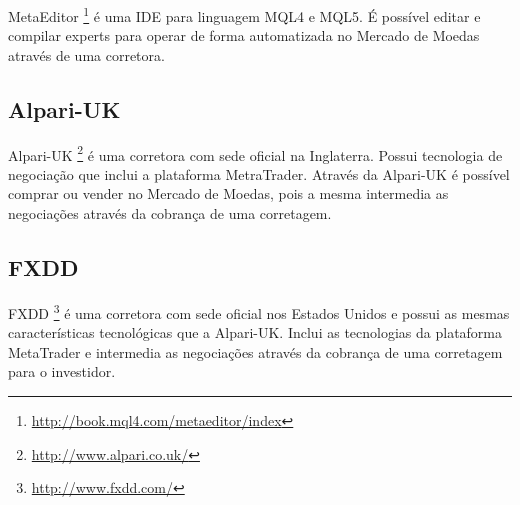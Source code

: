 MetaEditor \footnote{\url{http://book.mql4.com/metaeditor/index}} é uma IDE para linguagem MQL4 e MQL5. É possível editar e compilar experts para operar de forma automatizada no Mercado de Moedas através de uma corretora.

\subsection{Alpari-UK}

Alpari-UK \footnote{\url{http://www.alpari.co.uk/}} é uma corretora com sede oficial na Inglaterra. Possui tecnologia de negociação que inclui a plataforma MetraTrader. Através da Alpari-UK é possível comprar ou vender no Mercado de Moedas, pois a mesma intermedia as negociações através da cobrança de uma corretagem.

\subsection{FXDD}

FXDD \footnote{\url{http://www.fxdd.com/}} é uma corretora com sede oficial nos Estados Unidos e possui as mesmas características tecnológicas que a Alpari-UK. Inclui as tecnologias da plataforma MetaTrader e intermedia as negociações através da cobrança de uma corretagem para o investidor.
